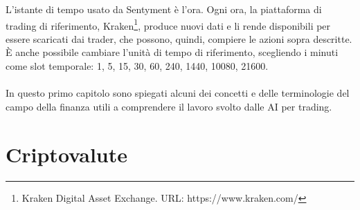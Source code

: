 \documentclass[a4paper,12pt]{report}
\begin{document}
L'istante di tempo usato da Sentyment è l'ora. Ogni ora, la piattaforma di trading di riferimento, Kraken\footnote{Kraken Digital Asset Exchange. URL: https://www.kraken.com/}, produce nuovi dati e li rende disponibili per essere scaricati dai trader, che possono, quindi, compiere le azioni sopra descritte. È anche possibile cambiare l'unità di tempo di riferimento, scegliendo i minuti come slot temporale: 1, 5, 15, 30, 60, 240, 1440, 10080, 21600.\\~\\
In questo primo capitolo sono spiegati alcuni dei concetti e delle terminologie del campo della finanza utili a comprendere il lavoro svolto dalle AI per trading.

\section{Criptovalute}
\end{document}
